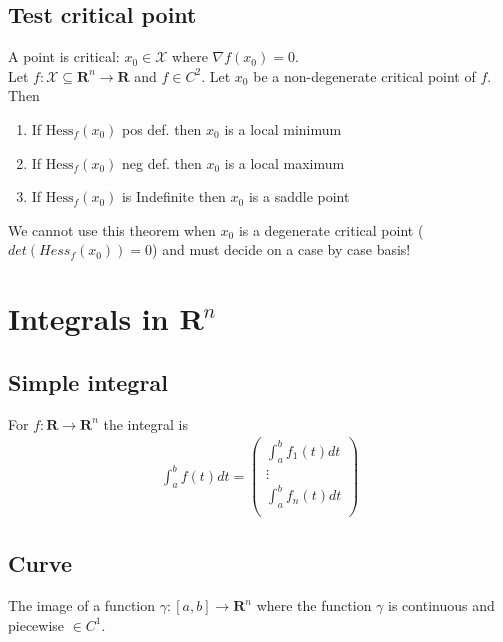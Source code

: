 \documentclass[8pt]{extarticle}
\newcommand{\R}{{\mathbb R}}
\newcommand{\X}{{\mathcal X}}
\newcommand{\ra}{{\rightarrow}}
\def\R{\mathbf{R}}
\begin{document}
\begin{multicols*}{3}
  \subsection{Test critical point}
  A point is critical: $x_0 \in \X$ where $\nabla f(x_0) = 0$. \\
  Let $f:\X \subseteq \R^n \ra \R$ and $f \in C^2$. Let $x_0$ be a
  non-degenerate critical point of $f$. Then
  \begin{enumerate}[label=(\arabic*)]
    \item If $\text{Hess}_f(x_0)$ pos def. then $x_0$ is a local minimum
    \item If $\text{Hess}_f(x_0)$ neg def. then $x_0$ is a local maximum
    \item If $\text{Hess}_f(x_0)$ is Indefinite then $x_0$
          is a saddle point
  \end{enumerate}
  We cannot use this theorem when $x_0$ is a degenerate critical
  point ($det(Hess_f(x_0)) = 0$) and must decide on a case by case basis!
  \section{Integrals in $\R^n$}
  \hypertarget{sec:2}{}
  \subsection{Simple integral}
  For $f: \R \ra \R^n$ the integral is
  \begin{align*}
    \int_a^b f(t) dt =
    \begin{pmatrix}
      \int_a^b f_1(t) dt \\
      \vdots             \\
      \int_a^b f_n(t) dt \\
    \end{pmatrix}
  \end{align*}
  \subsection{Curve}
  The image of a function $\gamma: [a, b] \ra \R^n$
  where the function $\gamma$ is continuous and piecewise $\in C^1$.\\ \\

\end{multicols*}
\end{document}
